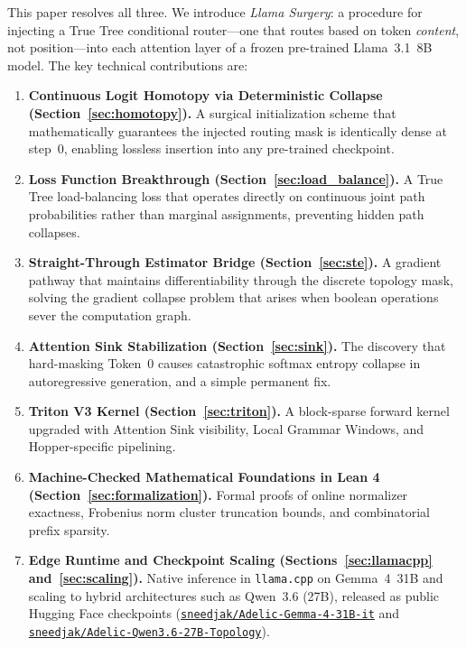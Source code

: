 \documentclass[11pt,a4paper]{article}
\begin{document}
This paper resolves all three. We introduce \emph{Llama Surgery}: a procedure for injecting a True Tree conditional router---one that routes based on token \emph{content}, not position---into each attention layer of a frozen pre-trained Llama~3.1~8B model. The key technical contributions are:

\begin{enumerate}
    \item \textbf{Continuous Logit Homotopy via Deterministic Collapse (Section~\ref{sec:homotopy}).} A surgical initialization scheme that mathematically guarantees the injected routing mask is identically dense at step~0, enabling lossless insertion into any pre-trained checkpoint.
    \item \textbf{Loss Function Breakthrough (Section~\ref{sec:load_balance}).} A True Tree load-balancing loss that operates directly on continuous joint path probabilities rather than marginal assignments, preventing hidden path collapses.
    \item \textbf{Straight-Through Estimator Bridge (Section~\ref{sec:ste}).} A gradient pathway that maintains differentiability through the discrete topology mask, solving the gradient collapse problem that arises when boolean operations sever the computation graph.
    \item \textbf{Attention Sink Stabilization (Section~\ref{sec:sink}).} The discovery that hard-masking Token~0 causes catastrophic softmax entropy collapse in autoregressive generation, and a simple permanent fix.
    \item \textbf{Triton V3 Kernel (Section~\ref{sec:triton}).} A block-sparse forward kernel upgraded with Attention Sink visibility, Local Grammar Windows, and Hopper-specific pipelining.
    \item \textbf{Machine-Checked Mathematical Foundations in Lean 4 (Section~\ref{sec:formalization}).} Formal proofs of online normalizer exactness, Frobenius norm cluster truncation bounds, and combinatorial prefix sparsity.
    \item \textbf{Edge Runtime and Checkpoint Scaling (Sections~\ref{sec:llamacpp} and~\ref{sec:scaling}).} Native inference in \texttt{llama.cpp} on Gemma~4~31B and scaling to hybrid architectures such as Qwen~3.6 (27B), released as public Hugging Face checkpoints (\href{https://huggingface.co/sneedjak/Adelic-Gemma-4-31B-it}{\texttt{sneedjak/Adelic-Gemma-4-31B-it}} and \href{https://huggingface.co/sneedjak/Adelic-Qwen3.6-27B-Topology}{\texttt{sneedjak/Adelic-Qwen3.6-27B-Topology}}).
\end{enumerate}
\end{document}
